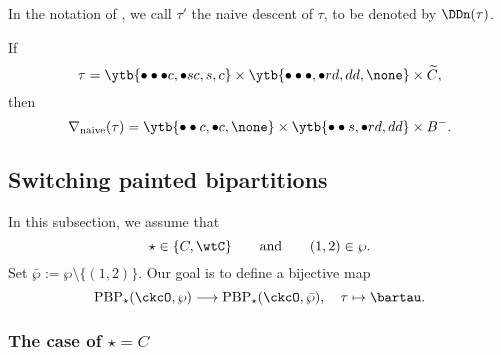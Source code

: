 \documentclass[ssunip]{subfiles}
\begin{document}
 In the notation of , we call $\tau'$ the naive descent of $\tau$, to be denoted by $\DDn(\tau)$.  
 

  

  
 \begin{Example} If
    \[
     \tau = \ytb{\bullet\bullet\bullet {c},\bullet {s} {c},{s},{c}}
    \times \ytb{\bullet\bullet\bullet ,\bullet {r} {d},{d}{d}, \none}
    \times \widetilde C, \]
   then 
   \[
    \nabla_{\mathrm{naive}}(\tau) =\ytb{\bullet\bullet{c} ,\bullet{c},\none }
    \times  \ytb{\bullet\bullet {s} ,\bullet {r} {d},{d}{d}}\times B^-.
    \]
    
\end{Example}

   
\subsection{Switching painted bipartitions}

  In  this subsection, we assume that 
  \[
  \star\in \{C, \wtC\}\qquad \textrm{and}\qquad  (1,2)\in \wp.
  \]
  Set $\bar \wp:=\wp\setminus\{(1,2)\}$. 
  Our goal is to define a bijective map
 \[
 \mathrm{PBP}_\star(\ckcO, \wp )\longrightarrow \mathrm{PBP}_\star(\ckcO, \bar\wp), \quad
 \tau \mapsto \bartau. 
 \]

  
\subsubsection{The case of $\star=C$}
\end{document}
